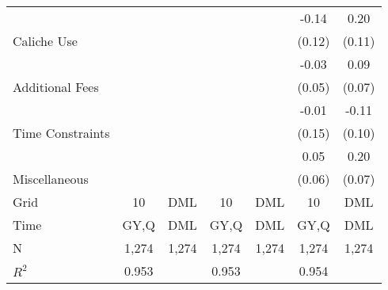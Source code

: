 \begin{tabular}{lcccccc}
 & \phantom{X} & \phantom{X} & \phantom{X} & \phantom{X} & -0.14 & 0.20\\

\multirow{-2}{*}{\raggedright\arraybackslash Caliche Use} & \phantom{X} & \phantom{X} & \phantom{X} & \phantom{X} & (0.12) & (0.11)\\

 & \phantom{X} & \phantom{X} & \phantom{X} & \phantom{X} & -0.03 & 0.09\\

\multirow{-2}{*}{\raggedright\arraybackslash Additional Fees} & \phantom{X} & \phantom{X} & \phantom{X} & \phantom{X} & (0.05) & (0.07)\\

 & \phantom{X} & \phantom{X} & \phantom{X} & \phantom{X} & -0.01 & -0.11\\

\multirow{-2}{*}{\raggedright\arraybackslash Time Constraints} & \phantom{X} & \phantom{X} & \phantom{X} & \phantom{X} & (0.15) & (0.10)\\

 & \phantom{X} & \phantom{X} & \phantom{X} & \phantom{X} & 0.05 & 0.20\\

\multirow{-2}{*}{\raggedright\arraybackslash Miscellaneous} & \phantom{X} & \phantom{X} & \phantom{X} & \phantom{X} & (0.06) & (0.07)\\

\midrule
Grid & 10 & DML & 10 & DML & 10 & DML\\

Time & GY,Q & DML & GY,Q & DML & GY,Q & DML\\

N & 1,274 & 1,274 & 1,274 & 1,274 & 1,274 & 1,274\\

$R^2$ & 0.953 &  & 0.953 &  & 0.954 & \\
\bottomrule
\end{tabular}
